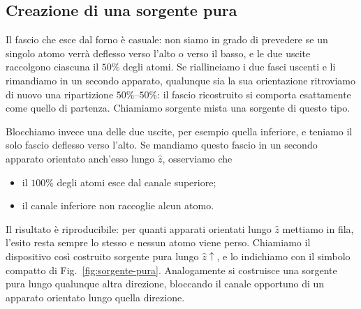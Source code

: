  
\subsection{Creazione di una sorgente pura}
 
Il fascio che esce dal forno è casuale: non siamo in grado di prevedere se un singolo atomo verrà deflesso verso l'alto o verso il basso, e le due uscite raccolgono ciascuna il $50\%$ degli atomi. 
Se riallineiamo i due fasci uscenti e li rimandiamo in un secondo apparato, qualunque sia la sua orientazione ritroviamo di nuovo una ripartizione $50\%$--$50\%$: il fascio ricostruito si comporta esattamente come quello di partenza. 
Chiamiamo sorgente mista una sorgente di questo tipo.
 
Blocchiamo invece una delle due uscite, per esempio quella inferiore, e teniamo il solo fascio deflesso verso l'alto. Se mandiamo questo fascio in un secondo apparato orientato anch'esso lungo $\hat{z}$, osserviamo che
%
\begin{itemize}
    \item il $100\%$ degli atomi esce dal canale superiore;
    \item il canale inferiore non raccoglie alcun atomo.
\end{itemize}
%
Il risultato è riproducibile: per quanti apparati orientati lungo $\hat{z}$ mettiamo in fila, l'esito resta sempre lo stesso e nessun atomo viene perso.
Chiamiamo il dispositivo così costruito sorgente pura lungo $\hat{z}\!\uparrow$, e lo indichiamo con il simbolo compatto di Fig.~\ref{fig:sorgente-pura}. Analogamente si costruisce una sorgente pura lungo qualunque altra direzione, bloccando il canale opportuno di un apparato orientato lungo quella direzione.
 
